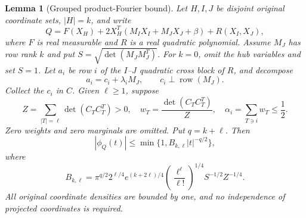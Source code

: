 \documentclass[11pt]{article}
\numberwithin{equation}{section}
\newtheorem{lemma}[theorem]{Lemma}
\theoremstyle{definition}\newtheorem{definition}[theorem]{Definition}
\theoremstyle{remark}\newtheorem{remark}[theorem]{Remark}
\newcommand{\1}{\mathbf 1}\newcommand{\diag}{\operatorname{diag}}
\begin{document}
\begin{lemma}[Grouped product-Fourier bound]\label{lem:grouped}
Let $H,I,J$ be disjoint original coordinate sets, $|H|=k$, and write
\begin{equation}\label{eq:grouped-form}
 Q=F(X_H)+2X_H^T(M_I X_I+M_J X_J+\beta)+R(X_I,X_J),
\end{equation}
where $F$ is real measurable and $R$ is a real quadratic polynomial. Assume $M_J$ has row rank $k$ and put $S=\sqrt{\det(M_JM_J^T)}$. For $k=0$, omit the hub variables and set $S=1$. Let $a_i$ be row $i$ of the $I$--$J$ quadratic cross block of $R$, and decompose
\[
 a_i=c_i+\lambda_iM_J,\qquad c_i\perp\operatorname{row}(M_J).
\]
Collect the $c_i$ in $C$. Given $\ell\ge1$, suppose
\[
 Z=\sum_{|T|=\ell}\det(C_TC_T^T)>0,\quad
 w_T=\frac{\det(C_TC_T^T)}Z,\quad
 \alpha_i=\sum_{T\ni i}w_T\le\frac12.
\]
Zero weights and zero marginals are omitted. Put $q=k+\ell$. Then
\begin{equation}\label{eq:grouped-envelope}
 |\phi_Q(t)|\le\min\{1,B_{k,\ell}|t|^{-q/2}\},
\end{equation}
where
\begin{equation}\label{eq:grouped-constant}
 B_{k,\ell}=\pi^{q/2}2^{\ell/4}e^{(k+2\ell)/4}
 \left(\frac{\ell^\ell}{\ell!}\right)^{1/4}S^{-1/2}Z^{-1/4}.
\end{equation}
All original coordinate densities are bounded by one, and no independence of projected coordinates is required.
\end{lemma}
\end{document}

